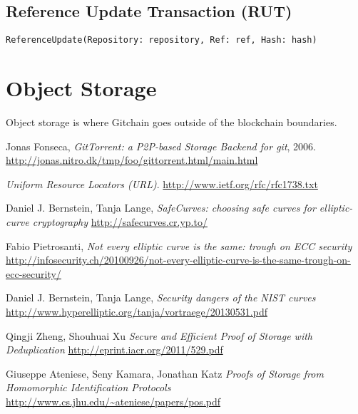 \documentclass[a4paper]{article}
\begin{document}
\subsection{Reference Update Transaction (RUT)}

\begin{verbatim}
ReferenceUpdate(Repository: repository, Ref: ref, Hash: hash)
\end{verbatim}

\section{Object Storage}

Object storage is where Gitchain goes outside of the blockchain boundaries.

\begin{thebibliography}{9}

  Jonas Fonseca,
  \emph{GitTorrent: a P2P-based Storage Backend for git}, 2006.
  \url{http://jonas.nitro.dk/tmp/foo/gittorrent.html/main.html}

  \emph{Uniform Resource Locators (URL)}.
  \url{http://www.ietf.org/rfc/rfc1738.txt}

  Daniel J. Bernstein, Tanja Lange,
  \emph{SafeCurves: choosing safe curves for elliptic-curve cryptography}
  \url{http://safecurves.cr.yp.to/}

  Fabio Pietrosanti,
  \emph{Not every elliptic curve is the same: trough on ECC security}
  \url{http://infosecurity.ch/20100926/not-every-elliptic-curve-is-the-same-trough-on-ecc-security/}

  Daniel J. Bernstein, Tanja Lange,
  \emph{Security dangers of the NIST curves}
  \url{http://www.hyperelliptic.org/tanja/vortraege/20130531.pdf}

  Qingji Zheng, Shouhuai Xu
  \emph{Secure and Efficient Proof of Storage with Deduplication}
  \url{http://eprint.iacr.org/2011/529.pdf}

  Giuseppe Ateniese, Seny Kamara, Jonathan Katz
  \emph{Proofs of Storage from Homomorphic Identification Protocols}
  \url{http://www.cs.jhu.edu/~ateniese/papers/pos.pdf}

\end{thebibliography}
\end{document}
